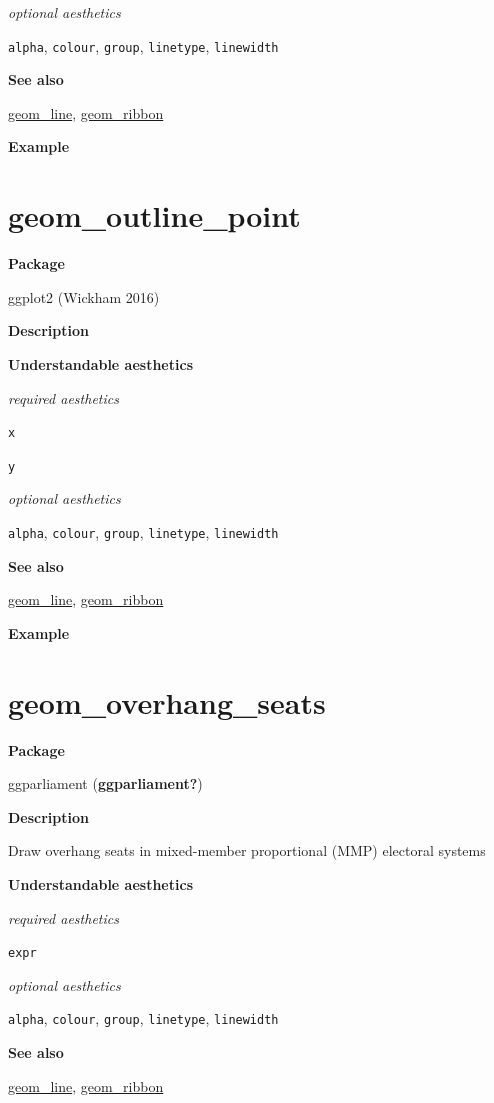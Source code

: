 \documentclass[
  letterpaper,
  DIV=11,
  numbers=noendperiod]{scrreprt}
\begin{document}
\emph{optional aesthetics}

\texttt{alpha}, \texttt{colour}, \texttt{group}, \texttt{linetype},
\texttt{linewidth}

\textbf{See also}

\hyperref[line]{geom\_line}, \hyperref[ribbon]{geom\_ribbon}

\textbf{Example}

\section{geom\_outline\_point}\label{outline_point}

\textbf{Package}

ggplot2 (Wickham 2016)

\textbf{Description}

\textbf{Understandable aesthetics}

\emph{required aesthetics}

\texttt{x}

\texttt{y}

\emph{optional aesthetics}

\texttt{alpha}, \texttt{colour}, \texttt{group}, \texttt{linetype},
\texttt{linewidth}

\textbf{See also}

\hyperref[line]{geom\_line}, \hyperref[ribbon]{geom\_ribbon}

\textbf{Example}

\section{geom\_overhang\_seats}\label{overhang_seats}

\textbf{Package}

ggparliament (\textbf{ggparliament?})

\textbf{Description}

Draw overhang seats in mixed-member proportional (MMP) electoral systems

\textbf{Understandable aesthetics}

\emph{required aesthetics}

\texttt{expr}

\emph{optional aesthetics}

\texttt{alpha}, \texttt{colour}, \texttt{group}, \texttt{linetype},
\texttt{linewidth}

\textbf{See also}

\hyperref[line]{geom\_line}, \hyperref[ribbon]{geom\_ribbon}
\end{document}
